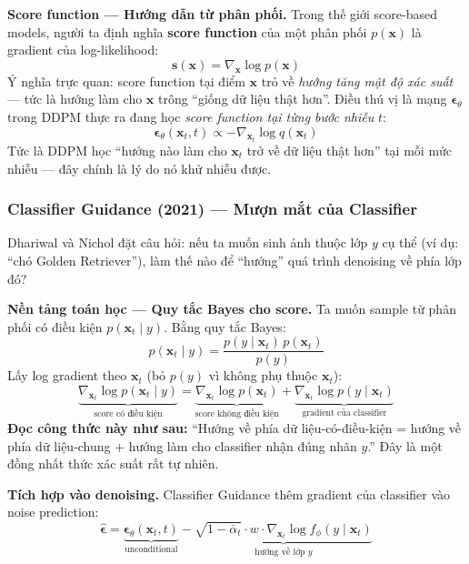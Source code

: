 \textbf{Score function --- Hướng dẫn từ phân phối.}
Trong thế giới score-based models, người ta định nghĩa \textbf{score function} của một phân phối $p(\mathbf{x})$ là gradient của log-likelihood:
\[
    \mathbf{s}(\mathbf{x}) = \nabla_{\mathbf{x}} \log p(\mathbf{x})
\]
Ý nghĩa trực quan: score function tại điểm $\mathbf{x}$ trỏ về \textit{hướng tăng mật độ xác suất} --- tức là hướng làm cho $\mathbf{x}$ trông ``giống dữ liệu thật hơn''. Điều thú vị là mạng $\boldsymbol{\epsilon}_\theta$ trong DDPM thực ra đang học \textit{score function tại từng bước nhiễu} $t$:
\[
    \boldsymbol{\epsilon}_\theta(\mathbf{x}_t, t) \propto -\nabla_{\mathbf{x}_t} \log q(\mathbf{x}_t)
\]
Tức là DDPM học ``hướng nào làm cho $\mathbf{x}_t$ trở về dữ liệu thật hơn'' tại mỗi mức nhiễu --- đây chính là lý do nó khử nhiễu được.

\subsubsection{Classifier Guidance (2021) --- Mượn mắt của Classifier}
\label{subsubsec:classifier_guidance}

Dhariwal và Nichol \cite{Dhariwal2021} đặt câu hỏi: nếu ta muốn sinh ảnh thuộc lớp $y$ cụ thể (ví dụ: ``chó Golden Retriever''), làm thế nào để ``hướng'' quá trình denoising về phía lớp đó?

\textbf{Nền tảng toán học --- Quy tắc Bayes cho score.}
Ta muốn sample từ phân phối có điều kiện $p(\mathbf{x}_t \mid y)$. Bằng quy tắc Bayes:
\[
    p(\mathbf{x}_t \mid y) = \frac{p(y \mid \mathbf{x}_t)\, p(\mathbf{x}_t)}{p(y)}
\]
Lấy log gradient theo $\mathbf{x}_t$ (bỏ $p(y)$ vì không phụ thuộc $\mathbf{x}_t$):
\[
    \underbrace{\nabla_{\mathbf{x}_t} \log p(\mathbf{x}_t \mid y)}_{\text{score có điều kiện}} = \underbrace{\nabla_{\mathbf{x}_t} \log p(\mathbf{x}_t)}_{\text{score không điều kiện}} + \underbrace{\nabla_{\mathbf{x}_t} \log p(y \mid \mathbf{x}_t)}_{\text{gradient của classifier}}
\]
\textbf{Đọc công thức này như sau:} ``Hướng về phía dữ liệu-có-điều-kiện = hướng về phía dữ liệu-chung + hướng làm cho classifier nhận đúng nhãn $y$.'' Đây là một đồng nhất thức xác suất rất tự nhiên.

\textbf{Tích hợp vào denoising.}
Classifier Guidance thêm gradient của classifier vào noise prediction:
\begin{equation}
    \hat{\boldsymbol{\epsilon}} = \underbrace{\boldsymbol{\epsilon}_\theta(\mathbf{x}_t, t)}_{\text{unconditional}} - \underbrace{\sqrt{1-\bar{\alpha}_t} \cdot w \cdot \nabla_{\mathbf{x}_t} \log f_\phi(y \mid \mathbf{x}_t)}_{\text{hướng về lớp } y}
\end{equation}

